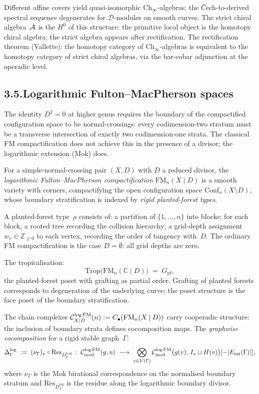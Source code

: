 Different affine covers yield quasi-isomorphic
$\mathrm{Ch}_\infty$-algebras: the \v{C}ech-to-derived spectral
sequence degenerates for $\mathcal D$-modules on smooth curves.
The strict chiral algebra~$\mathcal{A}$ is the $H^0$ of this structure: the
primitive local object is the homotopy chiral algebra; the strict
algebra appears after rectification. The rectification theorem
(Vallette): the homotopy category of $\mathrm{Ch}_\infty$-algebras
is equivalent to the homotopy category of strict chiral algebras,
via the bar-cobar adjunction at the operadic level.

\subsection*{3.5.\enspace Logarithmic Fulton--MacPherson spaces}

The identity $D^2=0$ at higher genus requires the boundary of
the compactified configuration space to be normal-crossings:
every codimension-two stratum must be a transverse intersection
of exactly two codimension-one strata. The classical FM
compactification does not achieve this in the presence of
a divisor; the logarithmic extension (Mok) does.

For a simple-normal-crossing pair $(X,D)$ with $D$ a reduced
divisor, the \emph{logarithmic Fulton--MacPherson
compactification} $\mathrm{FM}_n(X\mathbin{|}D)$ is a smooth
variety with corners, compactifying the open configuration space
$\mathrm{Conf}_n(X\setminus D)$, whose boundary stratification is
indexed by \emph{rigid planted-forest types}.

A planted-forest type~$\rho$ consists of: a partition of
$\{1,\dots,n\}$ into blocks; for each block, a rooted tree recording
the collision hierarchy; a grid-depth assignment
$w_v\in\mathbb Z_{\ge 0}$ to each vertex, recording the order of
tangency with~$D$. The ordinary FM compactification is the case
$D=\emptyset$: all grid depths are zero.

The tropicalisation:
\[
\mathrm{Trop}\bigl(\mathrm{FM}_n(\mathbb C\mathbin{|}D)\bigr)
\;=\;
G_{\mathrm{pf}},
\]
the planted-forest poset with grafting as partial order. Grafting
of planted forests corresponds to degeneration of the underlying
curve; the poset structure is the face poset of the boundary
stratification.

The chain complexes
$\mathcal{C}^{\log\mathrm{FM}}_{X|D}(n)
:=C_\bullet(\mathrm{FM}_n(X\mathbin{|}D))$ carry cooperadic
structure: the inclusion of boundary strata defines cocomposition
maps. The \emph{graphwise cocomposition} for a rigid stable
graph~$\Gamma$:
\[
\Delta^{\log}_\Gamma
\;:=\;
(\nu_\Gamma)_*\circ\mathrm{Res}_{D^{\log}_\Gamma}
\;\colon\;
\mathcal{C}^{\log\mathrm{FM}}_{\mathrm{mod}}(g,n)
\;\longrightarrow\;
\bigotimes_{v\in V(\Gamma)}
\mathcal{C}^{\log\mathrm{FM}}_{\mathrm{mod}}\bigl(g(v),\,
I_v\sqcup H(v)\bigr)[-|E_{\mathrm{int}}(\Gamma)|],
\]
where $\nu_\Gamma$ is the Mok birational correspondence on the
normalised boundary stratum and
$\mathrm{Res}_{D^{\log}_\Gamma}$ is the residue along the
logarithmic boundary divisor.

